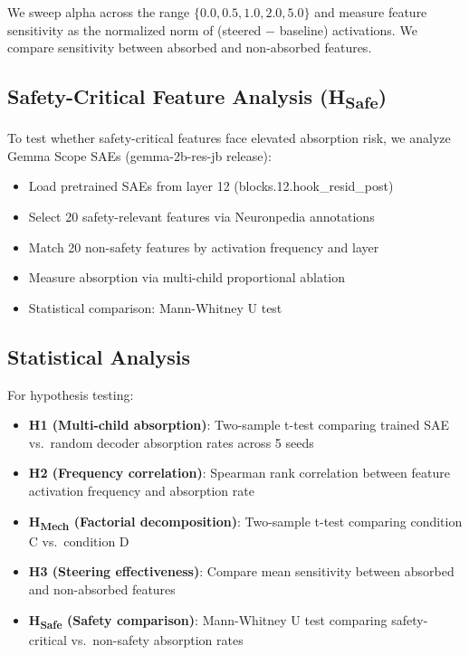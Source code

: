 \documentclass{article}
\begin{document}
We sweep alpha across the range $\{0.0, 0.5, 1.0, 2.0, 5.0\}$ and measure feature sensitivity as the normalized norm of (steered $-$ baseline) activations. We compare sensitivity between absorbed and non-absorbed features.

\subsection{Safety-Critical Feature Analysis (H\textsubscript{Safe})}

To test whether safety-critical features face elevated absorption risk, we analyze Gemma Scope SAEs (gemma-2b-res-jb release):

\begin{itemize}
\item Load pretrained SAEs from layer 12 (blocks.12.hook\_resid\_post)
\item Select 20 safety-relevant features via Neuronpedia annotations
\item Match 20 non-safety features by activation frequency and layer
\item Measure absorption via multi-child proportional ablation
\item Statistical comparison: Mann-Whitney U test
\end{itemize}

\subsection{Statistical Analysis}

For hypothesis testing:

\begin{itemize}
\item \textbf{H1 (Multi-child absorption)}: Two-sample t-test comparing trained SAE vs.\ random decoder absorption rates across 5 seeds
\item \textbf{H2 (Frequency correlation)}: Spearman rank correlation between feature activation frequency and absorption rate
\item \textbf{H\textsubscript{Mech} (Factorial decomposition)}: Two-sample t-test comparing condition C vs.\ condition D
\item \textbf{H3 (Steering effectiveness)}: Compare mean sensitivity between absorbed and non-absorbed features
\item \textbf{H\textsubscript{Safe} (Safety comparison)}: Mann-Whitney U test comparing safety-critical vs.\ non-safety absorption rates
\end{itemize}
\end{document}
